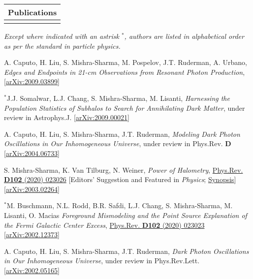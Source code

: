\documentclass[11pt]{article}
\newenvironment{packed_enumerate}{
\begin{etaremune}
  \setlength{\itemsep}{3pt}
  \setlength{\parskip}{0pt}
  \setlength{\parsep}{0pt}}{\end{etaremune}
}
\begin{document}
\noindent
\begin{tabular*}{\textwidth}{l@{\extracolsep{\fill}}}
\large {\sc \Large{Publications}}\\
\hline
\vspace{.5mm}
\end{tabular*}
\vspace{1.5mm}
\emph{Except where indicated with an astrisk $^*$, authors are listed in alphabetical order as per the standard in particle physics.}
\begin{packed_enumerate}

\item A. Caputo, H. Liu, S. Mishra-Sharma, M. Pospelov, J.T. Ruderman, A. Urbano, \emph{Edges and Endpoints in 21-cm Observations from Resonant Photon Production}, \href{https://arxiv.org/abs/2009.03899}{[arXiv:2009.03899]}

\item $^*$J.J. Somalwar, L.J. Chang, S. Mishra-Sharma, M. Lisanti, \emph{Harnessing the Population Statistics of Subhalos to Search for Annihilating Dark Matter}, under review in Astrophys.J. \href{https://arxiv.org/abs/2009.00021}{[arXiv:2009.00021]}

\item A. Caputo, H. Liu, S. Mishra-Sharma, J.T. Ruderman, \emph{Modeling Dark Photon Oscillations in Our Inhomogeneous Universe}, under review in Phys.Rev. \textbf{D}  \href{https://arxiv.org/abs/2004.06733}{[arXiv:2004.06733]}

\item S. Mishra-Sharma, K. Van Tilburg, N. Weiner, \emph{Power of Halometry}, \href{https://journals.aps.org/prd/abstract/10.1103/PhysRevD.102.023026}{Phys.Rev. \textbf{D102} (2020) 023026} [Editors' Suggestion and Featured in \emph{Physics}; \href{https://physics.aps.org/articles/v13/s98}{Synopsis}]  \href{https://arxiv.org/abs/2003.02264}{[arXiv:2003.02264]}

\item $^*$M. Buschmann, N.L. Rodd, B.R. Safdi, L.J. Chang, S. Mishra-Sharma, M. Lisanti, O. Macias \emph{Foreground Mismodeling and the Point Source Explanation of the Fermi Galactic Center Excess},  \href{https://journals.aps.org/prd/abstract/10.1103/PhysRevD.102.023023}{Phys.Rev. \textbf{D102} (2020) 023023} \href{https://arxiv.org/abs/2002.12373}{[arXiv:2002.12373]} 

\item A. Caputo, H. Liu, S. Mishra-Sharma, J.T. Ruderman, \emph{Dark Photon Oscillations in Our Inhomogeneous Universe}, under review in Phys.Rev.Lett. \href{https://arxiv.org/abs/2002.05165}{[arXiv:2002.05165]}


\end{packed_enumerate}
\end{document}
